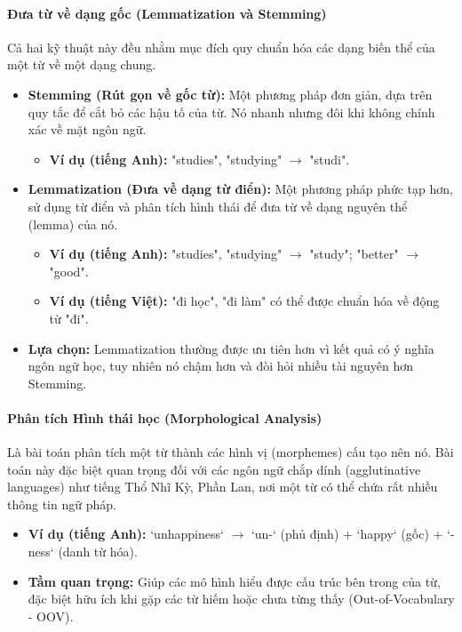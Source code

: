 \paragraph{Đưa từ về dạng gốc (Lemmatization và Stemming)}
Cả hai kỹ thuật này đều nhằm mục đích quy chuẩn hóa các dạng biến thể của một từ về một dạng chung.
\begin{itemize}
    \item \textbf{Stemming (Rút gọn về gốc từ):} Một phương pháp đơn giản, dựa trên quy tắc để cắt bỏ các hậu tố của từ. Nó nhanh nhưng đôi khi không chính xác về mặt ngôn ngữ.
        \begin{itemize}
            \item \textbf{Ví dụ (tiếng Anh):} "studies", "studying" $\rightarrow$ "studi".
        \end{itemize}
    \item \textbf{Lemmatization (Đưa về dạng từ điển):} Một phương pháp phức tạp hơn, sử dụng từ điển và phân tích hình thái để đưa từ về dạng nguyên thể (lemma) của nó.
        \begin{itemize}
            \item \textbf{Ví dụ (tiếng Anh):} "studies", "studying" $\rightarrow$ "study"; "better" $\rightarrow$ "good".
            \item \textbf{Ví dụ (tiếng Việt):} "đi học", "đi làm" có thể được chuẩn hóa về động từ "đi".
        \end{itemize}
    \item \textbf{Lựa chọn:} Lemmatization thường được ưu tiên hơn vì kết quả có ý nghĩa ngôn ngữ học, tuy nhiên nó chậm hơn và đòi hỏi nhiều tài nguyên hơn Stemming.
\end{itemize}

\paragraph{Phân tích Hình thái học (Morphological Analysis)}
Là bài toán phân tích một từ thành các hình vị (morphemes) cấu tạo nên nó. Bài toán này đặc biệt quan trọng đối với các ngôn ngữ chắp dính (agglutinative languages) như tiếng Thổ Nhĩ Kỳ, Phần Lan, nơi một từ có thể chứa rất nhiều thông tin ngữ pháp.
\begin{itemize}
    \item \textbf{Ví dụ (tiếng Anh):} `unhappiness` $\rightarrow$ `un-` (phủ định) + `happy` (gốc) + `-ness` (danh từ hóa).
    \item \textbf{Tầm quan trọng:} Giúp các mô hình hiểu được cấu trúc bên trong của từ, đặc biệt hữu ích khi gặp các từ hiếm hoặc chưa từng thấy (Out-of-Vocabulary - OOV).
\end{itemize}

